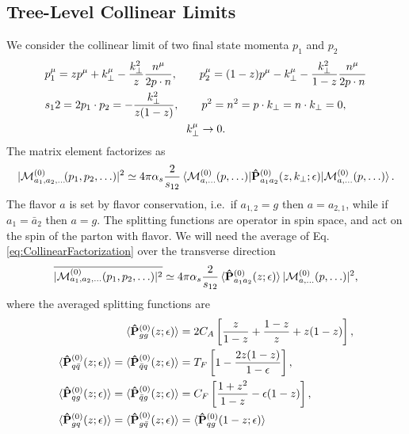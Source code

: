 \documentclass[a4paper,11pt]{article}
\begin{document}
\subsection{Tree-Level Collinear Limits}
We consider the collinear limit of two final state momenta $p_1$ and $p_2$
\begin{equation}
\begin{split}
&p_1^\mu = z p^\mu + k_\perp^\mu - \frac{k_\perp^2}{z} \frac{n^\mu}{2 p \cdot n}, \qquad p_2^\mu = (1 - z) p^\mu - k_\perp^\mu - \frac{k_\perp^2}{1 - z} \frac{n^\mu}{2 p \cdot n} \\
&s_12 = 2 p_1 \cdot p_2 = - \frac{k_\perp^2}{z (1 - z)}, \qquad p^2 = n^2 = p \cdot k_\perp = n \cdot k_\perp  = 0, \\
& \hspace{4.5cm} k_\perp^\mu \rightarrow 0.
\end{split}
\end{equation}
The matrix element factorizes as
\begin{equation}
|\mathcal{M}^{(0)}_{a_1, a_2, \dots} \! (p_1, p_2, \ldots)|^2 \simeq 4 \pi \alpha_s \frac{2}{s_{12}} \braket{\mathcal{M}^{(0)}_{a, \dots} (p, \ldots) | \mathbf{\hat{P}}_{a_1 a_2}^{(0)} (z, k_\perp; \epsilon) | \mathcal{M}_{a, \dots}^{(0)} (p, \ldots)}.
\label{eq:CollinearFactorization}
\end{equation}
The flavor $a$ is set by flavor conservation, i.e.\ if $a_{1,2} = g$ then $a = a_{2, 1}$, while if $a_1 = \bar{a}_2$ then $a = g$. The splitting functions are operator in spin space, and act on the spin of the parton with flavor. We will need the average of Eq. \eqref{eq:CollinearFactorization} over the transverse direction
\begin{equation}
\overline{|\mathcal{M}^{(0)}_{a_1, a_2, \dots} (p_1, p_2, \ldots)|^2} \simeq 4 \pi \alpha_s \frac{2}{s_{12}} \braket{\mathbf{\hat{P}}_{a_1 a_2}^{(0)}(z; \epsilon)} |\mathcal{M}^{(0)}_{a,\dots} (p, \ldots)|^2,
\end{equation}
where the averaged splitting functions are
\begin{equation}
\begin{split}
\braket{\mathbf{\hat{P}}_{gg}^{(0)}(z; \epsilon)} &= 2 C_A \left[ \frac{z}{1 - z} + \frac{1 - z}{z} + z (1 - z) \right], \\
\braket{\mathbf{\hat{P}}_{q \bar{q}}^{(0)}(z; \epsilon)} = \braket{\mathbf{\hat{P}}_{\bar{q} q}^{(0)}(z; \epsilon)} &= T_F \left[1 - \frac{2 z (1 - z)}{1 - \epsilon} \right], \\
\braket{\mathbf{\hat{P}}_{q g}^{(0)}(z; \epsilon)} = \braket{\mathbf{\hat{P}}_{\bar{q} g}^{(0)}(z; \epsilon)} &= C_F \left[ \frac{1 + z^2}{1 - z} - \epsilon (1 - z) \right], \\
\braket{\mathbf{\hat{P}}_{gq}^{(0)}(z; \epsilon)} = \braket{\mathbf{\hat{P}}_{g\bar{q}}^{(0)}(z; \epsilon)} &= \braket{\mathbf{\hat{P}}_{qg}^{(0)}(1 - z; \epsilon)}
\end{split}
\end{equation}
\end{document}
